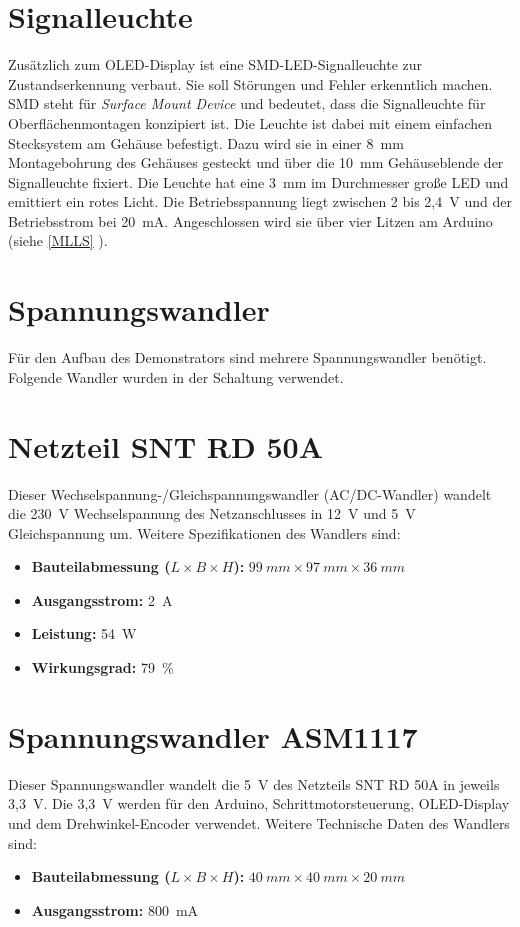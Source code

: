 \section{Signalleuchte}

Zusätzlich zum OLED-Display ist eine SMD-LED-Signalleuchte zur Zustandserkennung verbaut. Sie soll Störungen und Fehler erkenntlich machen. SMD steht für \emph{Surface Mount Device} und bedeutet, dass die Signalleuchte für Oberflächenmontagen konzipiert ist. Die Leuchte ist dabei mit einem einfachen Stecksystem am Gehäuse befestigt. Dazu wird sie in einer 8\ mm Montagebohrung des Gehäuses gesteckt und über die 10\ mm Gehäuseblende der Signalleuchte fixiert. Die Leuchte hat eine 3\ mm im Durchmesser große LED und emittiert ein rotes Licht. Die Betriebsspannung liegt zwischen 2 bis 2,4\ V und der Betriebsstrom bei 20\ mA. Angeschlossen wird sie über vier Litzen am Arduino (siehe \ref{MLLS} ).\cite{Mentor.2024}

\section{Spannungswandler}

Für den Aufbau des Demonstrators sind mehrere Spannungswandler benötigt. Folgende Wandler wurden in der Schaltung verwendet.

\section{Netzteil SNT RD 50A}

Dieser Wechselspannung-/Gleichspannungswandler (AC/DC-Wandler) wandelt die 230\ V Wechselspannung des Netzanschlusses in 12\ V  und 5\ V Gleichspannung um. 
Weitere Spezifikationen des Wandlers sind:
\begin{itemize}
	\item \textbf{Bauteilabmessung ($L\times B \times H$):} $99 \ mm \times 97 \ mm \times 36 \ mm$
	\item \textbf{Ausgangsstrom:} 2\ A
	\item \textbf{Leistung:} 54\ W
	\item \textbf{Wirkungsgrad:} 79\ \% 
\end{itemize} 
\cite{Meanwell.2019}

\section{Spannungswandler ASM1117}

Dieser Spannungswandler wandelt die 5\ V des Netzteils SNT RD 50A in jeweils 3,3\ V. Die 3,3\ V werden für den Arduino, Schrittmotorsteuerung, OLED-Display und dem Drehwinkel-Encoder verwendet. Weitere Technische Daten des Wandlers sind:
\begin{itemize}
	\item \textbf{Bauteilabmessung ($L\times B \times H$):} $40 \ mm \times 40 \ mm \times 20 \ mm$
	\item \textbf{Ausgangsstrom:} 800\ mA
\end{itemize}
	\cite{AMS.2024}
	
